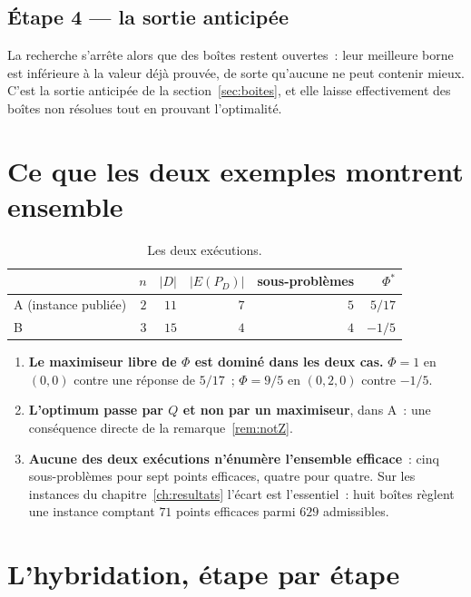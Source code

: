 \documentclass[12pt,a4paper]{report}
\newcommand{\Dset}{D}
\newcommand{\E}{E(P_D)}
\newcommand{\fig}[1]{}
\theoremstyle{plain}
\theoremstyle{definition}
\begin{document}
\subsection*{Étape 4 --- la sortie anticipée}
\begin{center}\fig{b-step4}\end{center}

\noindent
La recherche s'arrête alors que des boîtes restent ouvertes~: leur meilleure
borne est inférieure à la valeur déjà prouvée, de sorte qu'aucune ne peut
contenir mieux.  C'est la sortie anticipée de la section~\ref{sec:boites}, et
elle laisse effectivement des boîtes non résolues tout en prouvant
l'optimalité.

\section{Ce que les deux exemples montrent ensemble}

\begin{table}[h]
\centering
\caption{Les deux exécutions.}
\begin{tabular}{lrrrrr}
\toprule
 & $n$ & $|\Dset|$ & $|\E|$ & sous-problèmes & $\Phi^{*}$ \\
\midrule
A (instance publiée) & $2$ & $11$ & $7$ & $5$ & $5/17$ \\
B & $3$ & $15$ & $4$ & $4$ & $-1/5$ \\
\bottomrule
\end{tabular}
\end{table}

\begin{enumerate}[itemsep=4pt]
\item \textbf{Le maximiseur libre de $\Phi$ est dominé dans les deux cas.}
      $\Phi = 1$ en $(0,0)$ contre une réponse de $5/17$~; $\Phi = 9/5$ en
      $(0,2,0)$ contre $-1/5$.
\item \textbf{L'optimum passe par $Q$ et non par un maximiseur}, dans A~: une
      conséquence directe de la remarque~\ref{rem:notZ}.
\item \textbf{Aucune des deux exécutions n'énumère l'ensemble efficace}~: cinq
      sous-problèmes pour sept points efficaces, quatre pour quatre.  Sur les
      instances du chapitre~\ref{ch:resultats} l'écart est l'essentiel~: huit
      boîtes règlent une instance comptant $71$ points efficaces parmi $629$
      admissibles.
\end{enumerate}

\section{L'hybridation, étape par étape}
\end{document}

